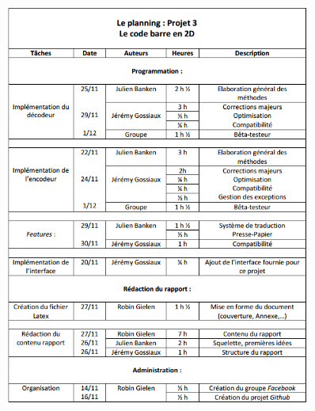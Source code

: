 \begin{figure}[!h]
	\centering
	\includegraphics[width=0.9\textwidth]{images/planning.png}
	\label{Cahier des charges}
\end{figure}

